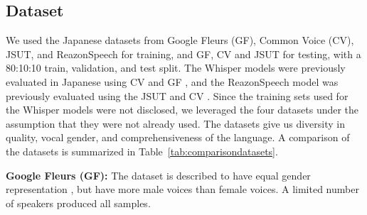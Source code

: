 \documentclass[10pt,twocolumn,letterpaper]{article}
\begin{document}
\subsection{Dataset}
We used the Japanese datasets from Google Fleurs (GF)\cite{conneauFLEURSFewshotLearning2022}, Common Voice (CV)\cite{ardilaCommonVoiceMassivelyMultilingual2020}, JSUT\cite{sonobeJSUTCorpusFree2017}, and ReazonSpeech \cite{yinReazonSpeechFreeMassive} for training, and GF, CV and JSUT for testing, with a 80:10:10 train, validation, and test split. The Whisper models were previously evaluated in Japanese using CV and GF \cite{radfordRobustSpeechRecognition}, and the ReazonSpeech model was previously evaluated using the JSUT and CV \cite{holdingsReazonSpeechV21Setting2024}. Since the training sets used for the Whisper models were not disclosed, we leveraged the four datasets under the assumption that they were not already used. The datasets give us diversity in quality, vocal gender, and comprehensiveness of the language. A comparison of the datasets is summarized in Table~\ref{tab:comparisondatasets}.
\begin{table}[ht]
\centering
{}
\caption{Comparison of Datasets}
\label{tab:comparisondatasets}
\end{table}

\textbf{Google Fleurs (GF):}
The dataset is described to have equal gender representation \cite{conneauFLEURSFewshotLearning2022}, but have more male voices than female voices. A limited number of speakers produced all samples.
\end{document}

